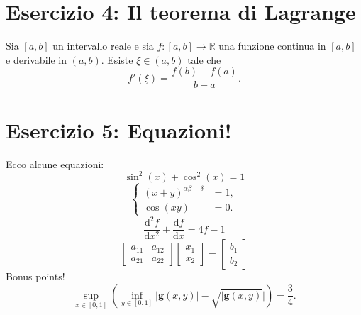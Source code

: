\documentclass[a4paper, 10pt]{article}
\begin{document}
	\section{Esercizio 4: Il teorema di Lagrange}
	Sia $[a,b]$ un intervallo reale e sia $f: [a,b] \to \mathbb{R}$ una funzione continua in $[a,b]$ e derivabile in $(a,b)$. Esiste $\xi \in (a,b)$ tale che	
	\begin{equation*}
		f'(\xi) = \frac{f(b)-f(a)}{b-a}.
	\end{equation*}
	\section{Esercizio 5: Equazioni!}
	Ecco alcune equazioni:
	\begin{equation*}
		\sin^2(x) + \cos^2(x) = 1 
	\end{equation*}
	\begin{equation*}	
		\begin{cases}
			\left( x + y\right)^{\alpha\beta+\delta} & = 1, \\
			\cos(xy) & = 0.
		\end{cases}
	\end{equation*}
	\begin{equation*}
		\frac{\mathrm{d}^2f}{\mathrm{d}x^2} + \frac{\mathrm{d}f}{\mathrm{d}x} = 4f - 1 
	\end{equation*}
	\begin{equation*}
		\begin{bmatrix}
			a_{11} & a_{12} \\ a_{21} & a_{22} 
		\end{bmatrix} 
		\begin{bmatrix}
			x_1 \\ x_2
		\end{bmatrix} = 
		\begin{bmatrix}
			b_1 \\ b_2
		\end{bmatrix}
	\end{equation*}
	Bonus points!
	\[
	\sup_{x \in [0,1]} \left( \inf_{y \in [0,1]} |\mathbf{g}(x,y)| - \sqrt{|\mathbf{g}(x,y)}| \right) = \frac{3}{4}.
	\]
\end{document}
